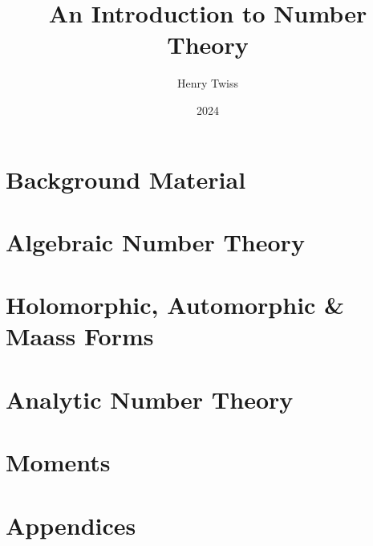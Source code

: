 \documentclass[12pt,oneside]{book}
\title{An Introduction to Number Theory}
\author{Henry Twiss}
\date{2024}
\begin{document}
\maketitle
\pagestyle{empty}
\tableofcontents
\setcounter{page}{0}
\pagestyle{fancy}

\part{Background Material}
  

\part{Algebraic Number Theory}
  
  

\part{Holomorphic, Automorphic \& Maass Forms}
  
  
  
  

\part{Analytic Number Theory}
  
  
  

\part{Moments}
  
  

\part{Appendices}
  

\printindex


\end{document}
